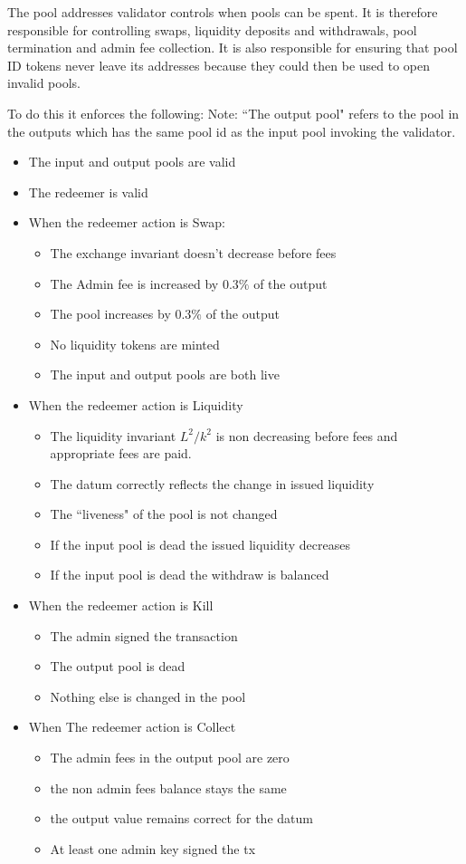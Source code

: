 \documentclass{article}
\begin{document}
The pool addresses validator controls when pools can be spent.
It is therefore responsible for controlling swaps,
liquidity deposits and withdrawals, pool termination
and admin fee collection.
It is also responsible for ensuring that
pool ID tokens never leave its addresses
because they could then be used to open invalid pools.

To do this it enforces the following:
Note: ``The output pool" refers to
the pool in the outputs which has the same pool id
as the input pool invoking the validator.

\begin{itemize}
	\item The input and output pools are valid
	\item The redeemer is valid
	\item When the redeemer action is Swap:
		\begin{itemize}
			\item The exchange invariant doesn't decrease before fees
			\item The Admin fee is increased by $0.3\%$ of the output
			\item The pool increases by $0.3\%$ of the output
			\item No liquidity tokens are minted
			\item The input and output pools are both live
		\end{itemize}
	\item When the redeemer action is Liquidity
		\begin{itemize}
			\item The liquidity invariant $L^2/k^2$ is non decreasing before fees
			and appropriate fees are paid.
			\item The datum correctly reflects the change in issued liquidity
			\item The ``liveness" of the pool is not changed
			\item If the input pool is dead the issued liquidity decreases
			\item If the input pool is dead the withdraw is balanced
		\end{itemize}
	\item When the redeemer action is Kill
		\begin{itemize}
			\item The admin signed the transaction
			\item The output pool is dead
			\item Nothing else is changed in the pool
		\end{itemize}
	\item When The redeemer action is Collect
		\begin{itemize}
			\item The admin fees in the output pool are zero
			\item the non admin fees balance stays the same
			\item the output value remains correct for the datum
			\item At least one admin key signed the tx
		\end{itemize}
\end{itemize}
\end{document}
